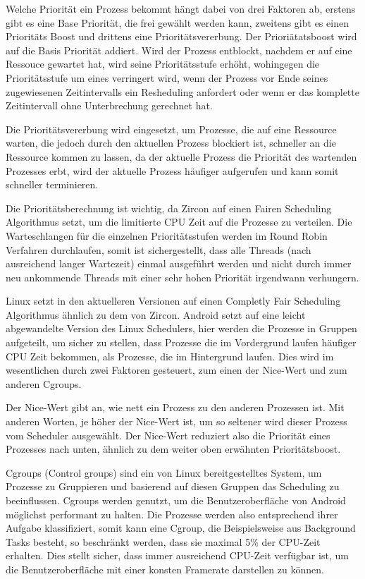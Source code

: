 \documentclass[a4paper]{scrartcl}
\begin{document}
Welche Priorität ein Prozess bekommt hängt dabei von drei Faktoren ab, erstens gibt es eine Base Priorität, die frei gewählt werden kann, zweitens gibt es einen Prioritäts Boost und drittens eine Prioritätsvererbung. Der Prioriätatsboost wird auf die Basis Priorität addiert. Wird der Prozess entblockt, nachdem er auf eine Ressouce gewartet hat, wird seine Prioritätsstufe erhöht, wohingegen die Prioritätsstufe um eines verringert wird, wenn der Prozess vor Ende seines zugewiesenen Zeitintervalls ein Resheduling anfordert oder wenn er das komplette Zeitintervall ohne Unterbrechung gerechnet hat.\cite{Fuchsia.Zircon.Scheduling}

Die Prioritätsvererbung wird eingesetzt, um Prozesse, die auf eine Ressource warten, die jedoch durch den aktuellen Prozess blockiert ist, schneller an die Ressource kommen zu lassen, da der aktuelle Prozess die Priorität des wartenden Prozesses erbt, wird der aktuelle Prozess häufiger aufgerufen und kann somit schneller terminieren.\cite{Fuchsia.Zircon.Scheduling}

Die Prioritätsberechnung ist wichtig, da Zircon auf einen Fairen Scheduling Algorithmus setzt, um die limitierte CPU Zeit auf die Prozesse zu verteilen. Die Warteschlangen für die einzelnen Prioritätsstufen werden im Round Robin Verfahren durchlaufen, somit ist sichergestellt, dass alle Threads (nach ausreichend langer Wartezeit) einmal ausgeführt werden und nicht durch immer neu ankommende Threads mit einer sehr hohen Priorität irgendwann verhungern. \cite{Fuchsia.Zircon.FairScheduler}

Linux setzt in den aktuelleren Versionen auf einen Completly Fair Scheduling Algorithmus ähnlich zu dem von Zircon. Android setzt auf eine leicht abgewandelte Version des Linux Schedulers, hier werden die Prozesse in Gruppen aufgeteilt, um sicher zu stellen, dass Prozesse die im Vordergrund laufen häufiger CPU Zeit bekommen, als Prozesse, die im Hintergrund laufen. Dies wird im wesentlichen durch zwei Faktoren gesteuert, zum einen der Nice-Wert und zum anderen Cgroups.\cite{Android.Process.Scheduler}

Der Nice-Wert gibt an, wie nett ein Prozess zu den anderen Prozessen ist. Mit anderen Worten, je höher der Nice-Wert ist, um so seltener wird dieser Prozess vom Scheduler ausgewählt. Der Nice-Wert reduziert also die Priorität eines Prozesses nach unten, ähnlich zu dem weiter oben erwähnten Prioritätsboost.\cite{Android.Process.Nice}

Cgroups (Control groups) sind ein von Linux bereitgestelltes System, um Prozesse zu Gruppieren und basierend auf diesen Gruppen das Scheduling zu beeinflussen. Cgroups werden genutzt, um die Benutzeroberfläche von Android möglichst performant zu halten. Die Prozesse werden also entsprechend ihrer Aufgabe klassifiziert, somit kann eine Cgroup, die Beispielsweise aus Background Tasks besteht, so beschränkt werden, dass sie maximal 5\% der CPU-Zeit erhalten. Dies stellt sicher, dass immer ausreichend CPU-Zeit verfügbar ist, um die Benutzeroberfläche mit einer konsten Framerate darstellen zu können.\cite{Android.Process.Cgroup}
\end{document}
